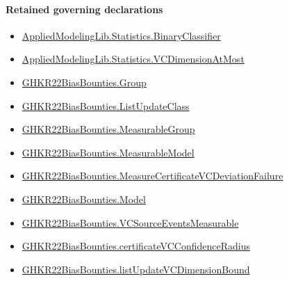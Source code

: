 \documentclass[10pt]{article}
\begin{document}
\paragraph{Retained governing declarations}
\begin{itemize}\raggedright
\item \hyperlink{governing-declaration-cb3af244ff388b59}{Applied\allowbreak{}Modeling\allowbreak{}Lib.\allowbreak{}Statistics.\allowbreak{}Binary\allowbreak{}Classifier}
\item \hyperlink{governing-declaration-bef3cff7f5ca4668}{Applied\allowbreak{}Modeling\allowbreak{}Lib.\allowbreak{}Statistics.\allowbreak{}VC\allowbreak{}Dimension\allowbreak{}At\allowbreak{}Most}
\item \hyperlink{paper-prerequisite-cc7214115b27106f}{GHKR22\allowbreak{}Bias\allowbreak{}Bounties.\allowbreak{}Group}
\item \hyperlink{governing-declaration-cce66ae9079d8b67}{GHKR22\allowbreak{}Bias\allowbreak{}Bounties.\allowbreak{}List\allowbreak{}Update\allowbreak{}Class}
\item \hyperlink{governing-declaration-8d5012d60e076f7c}{GHKR22\allowbreak{}Bias\allowbreak{}Bounties.\allowbreak{}Measurable\allowbreak{}Group}
\item \hyperlink{governing-declaration-8b721c00962c326a}{GHKR22\allowbreak{}Bias\allowbreak{}Bounties.\allowbreak{}Measurable\allowbreak{}Model}
\item \hyperlink{governing-declaration-6f5a52c3aa12cae8}{GHKR22\allowbreak{}Bias\allowbreak{}Bounties.\allowbreak{}Measure\allowbreak{}Certificate\allowbreak{}VC\allowbreak{}Deviation\allowbreak{}Failure}
\item \hyperlink{paper-prerequisite-333127605c12eba8}{GHKR22\allowbreak{}Bias\allowbreak{}Bounties.\allowbreak{}Model}
\item \hyperlink{governing-declaration-70b850324b52315e}{GHKR22\allowbreak{}Bias\allowbreak{}Bounties.\allowbreak{}VC\allowbreak{}Source\allowbreak{}Events\allowbreak{}Measurable}
\item \hyperlink{governing-declaration-a9ee489a4bd5beb4}{GHKR22\allowbreak{}Bias\allowbreak{}Bounties.\allowbreak{}certificate\allowbreak{}VC\allowbreak{}Confidence\allowbreak{}Radius}
\item \hyperlink{governing-declaration-e0b760fa5e801b6c}{GHKR22\allowbreak{}Bias\allowbreak{}Bounties.\allowbreak{}list\allowbreak{}Update\allowbreak{}VC\allowbreak{}Dimension\allowbreak{}Bound}
\end{itemize}
\end{document}
